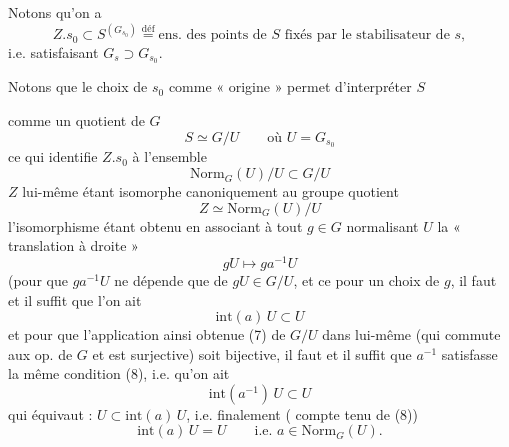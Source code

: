 \documentclass[11pt,a4paper]{article}
\begin{document}
Notons qu'on a
\[
Z.s_0\subset S^{(G_{s_0})}\overset{\text{déf}}{=}\text{ens. des points de } S \text{ fixés par le stabilisateur de } s, \tag{3}
\]
i.e. satisfaisant $G_s\supset G_{s_0}$.

Notons que le choix de $s_0$ comme « origine » permet d'interpréter $S$

comme un quotient de $G$
\[
S\simeq G/U\qquad\text{où } U=G_{s_0} \tag{4}
\]
ce qui identifie $Z.s_0$ à l'ensemble
\[
\mathrm{Norm}_G(U)/U\subset G/U \tag{5}
\]
$Z$ lui-même étant isomorphe canoniquement au groupe quotient
\[
Z\simeq\mathrm{Norm}_G(U)/U \tag{6}
\]
l'isomorphisme étant obtenu en associant à tout $g\in G$ normalisant $U$ la « translation à droite »
\[
gU\longmapsto ga^{-1}U \tag{7}
\]
(pour que $ga^{-1}U$ ne dépende que de $gU\in G/U$, et ce pour un choix de $g$, il faut et il suffit que l'on ait \struck{\ill{}} 
\[
\mathrm{int}(a)\,U\subset U \tag{8}
\]
et pour que l'application ainsi obtenue (7) de $G/U$ dans lui-même (qui commute aux op. de $G$ et est surjective) soit bijective, il faut et il suffit que $a^{-1}$ satisfasse la même condition (8), i.e. qu'on ait
\[
\mathrm{int}(a^{-1})\,U\subset U \tag{9}
\]
qui équivaut : $U\subset\mathrm{int}(a)\,U$, i.e. finalement ( compte tenu de (8))
\[
\mathrm{int}(a)\,U=U\qquad\text{i.e. } a\in\mathrm{Norm}_G(U). \tag{10}
\]
\end{document}
